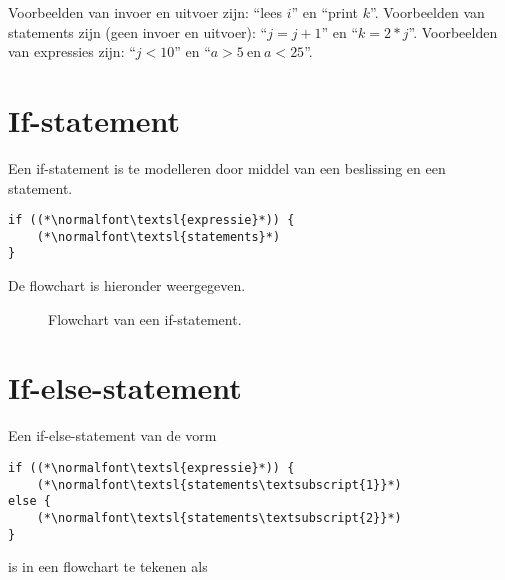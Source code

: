 Voorbeelden van invoer en uitvoer zijn: ``lees $i$'' en ``print $k$''. Voorbeelden
van statements zijn (geen invoer en uitvoer): ``$j = j+1$'' en ``$k=2*j$''.
Voorbeelden van expressies zijn: ``$j<10$'' en ``$a>5 \mathrm{\ en\ } a<25$''.


\section{If-statement}
Een if-statement is te modelleren door middel van een beslissing en een statement.

\begin{lstlisting}[caption=if-statement in C]
if ((*\normalfont\textsl{expressie}*)) {
    (*\normalfont\textsl{statements}*)
}
\end{lstlisting}

De flowchart is hieronder weergegeven.

\begin{figure}[!ht]
\centering
{}
\caption{Flowchart van een if-statement.}
\end{figure}


\section{If-else-statement}

Een if-else-statement van de vorm

\begin{lstlisting}[caption=If-else-statement in C.]
if ((*\normalfont\textsl{expressie}*)) {
    (*\normalfont\textsl{statements\textsubscript{1}}*)
else {
    (*\normalfont\textsl{statements\textsubscript{2}}*)
}
\end{lstlisting}

is in een flowchart te tekenen als

